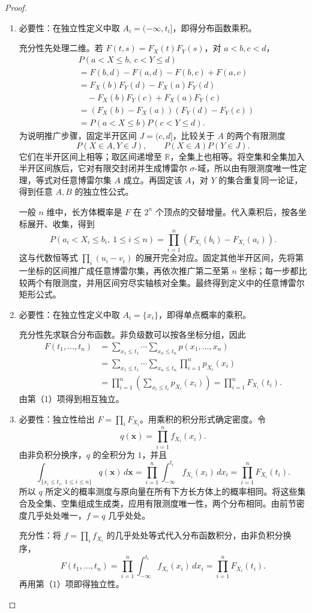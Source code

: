 \begin{proof}
\begin{enumerate}
\item 必要性：在独立性定义中取 $A_i=(-\infty,t_i]$，即得分布函数乘积。

充分性先处理二维。若 $F(t,s)=F_X(t)F_Y(s)$，对 $a<b,c<d$，
\begin{align*}
&P(a<X\leq b,\ c<Y\leq d)\\
&=F(b,d)-F(a,d)-F(b,c)+F(a,c)\\
&=F_X(b)F_Y(d)-F_X(a)F_Y(d)\\
&\quad-F_X(b)F_Y(c)+F_X(a)F_Y(c)\\
&=(F_X(b)-F_X(a))(F_Y(d)-F_Y(c))\\
&=P(a<X\leq b)P(c<Y\leq d).
\end{align*}
为说明推广步骤，固定半开区间 $J=(c,d]$，比较关于 $A$ 的两个有限测度
\[
P(X\in A,Y\in J),\qquad P(X\in A)P(Y\in J).
\]
它们在半开区间上相等；取区间递增至 $\mathbb R$，全集上也相等。将空集和全集加入半开区间族后，它对有限交封闭并生成博雷尔 $\sigma$-域，所以由有限测度唯一性定理，等式对任意博雷尔集 $A$ 成立。再固定该 $A$，对 $Y$ 的集合重复同一论证，得到任意 $A,B$ 的独立性公式。

一般 $n$ 维中，长方体概率是 $F$ 在 $2^n$ 个顶点的交替增量。代入乘积后，按各坐标展开、收集，得到
\[
P(a_i<X_i\leq b_i,\ 1\leq i\leq n)
=\prod_{i=1}^n(F_{X_i}(b_i)-F_{X_i}(a_i)).
\]
这与代数恒等式 $\prod_i(u_i-v_i)$ 的展开完全对应。固定其他半开区间，先将第一坐标的区间推广成任意博雷尔集，再依次推广第二至第 $n$ 坐标；每一步都比较两个有限测度，并用区间穷尽实轴核对全集。最终得到定义中的任意博雷尔矩形公式。

\item 必要性：在独立性定义中取 $A_i=\{x_i\}$，即得单点概率的乘积。

充分性先求联合分布函数。非负级数可以按各坐标分组，因此
\begin{align*}
F(t_1,\ldots,t_n)
&=\sum_{x_1\leq t_1}\cdots\sum_{x_n\leq t_n}p(x_1,\ldots,x_n)\\
&=\sum_{x_1\leq t_1}\cdots\sum_{x_n\leq t_n}\prod_{i=1}^np_{X_i}(x_i)\\
&=\prod_{i=1}^n\left(\sum_{x_i\leq t_i}p_{X_i}(x_i)\right)
=\prod_{i=1}^nF_{X_i}(t_i).
\end{align*}
由第（1）项得到相互独立。

\item 必要性：独立性给出 $F=\prod_iF_{X_i}$。用乘积的积分形式确定密度。令
\[
q(\boldsymbol x)=\prod_{i=1}^nf_{X_i}(x_i).
\]
由非负积分换序，$q$ 的全积分为 $1$，并且
\[
\int_{\{x_i\leq t_i,\ 1\leq i\leq n\}}q(\boldsymbol x)\,d\boldsymbol x
=\prod_{i=1}^n\int_{-\infty}^{t_i}f_{X_i}(x_i)\,dx_i
=\prod_{i=1}^nF_{X_i}(t_i).
\]
所以 $q$ 所定义的概率测度与原向量在所有下方长方体上的概率相同。将这些集合及全集、空集组成生成类，应用有限测度唯一性，两个分布相同。由前节密度几乎处处唯一，$f=q$ 几乎处处。

充分性：将 $f=\prod_i f_{X_i}$ 的几乎处处等式代入分布函数积分，由非负积分换序，
\[
F(t_1,\ldots,t_n)
=\prod_{i=1}^n\int_{-\infty}^{t_i}f_{X_i}(x_i)\,dx_i
=\prod_{i=1}^nF_{X_i}(t_i).
\]
再用第（1）项即得独立性。
\end{enumerate}
\end{proof}

